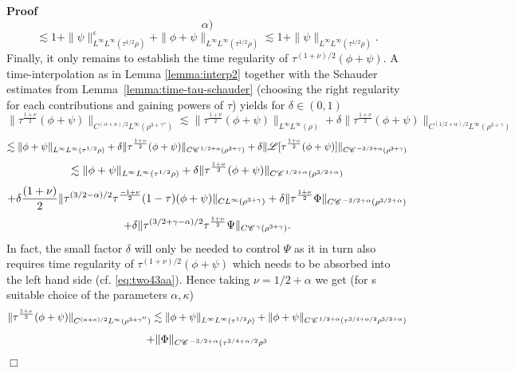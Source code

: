 \documentclass[a4paper,11pt]{article}
\newenvironment{proof}{\noindent\textbf{Proof\ }}{\hspace*{\fill}$\Box$\medskip}
\numberwithin{equation}{section}
\newcommand{\CC}{\mathscr{C} \hspace{.1em}}
\newcommand{\LL}{\mathscr{L}}
\newcommand{\8}{\infty}
\begin{document}
\begin{proof}
\[{{     \alpha})} \]
  \[ \lesssim 1 + \| \psi \|_{L^{\infty} L^{\infty} (\tau^{1 / 2}
     \rho)}^{\varepsilon} + \| \phi + \psi \|_{L^{\infty} L^{\infty} (\tau^{1
     / 2} \rho)} \lesssim 1 + \| \psi \|_{L^{\infty} L^{\infty}
     (\tau^{1 / 2} \rho)}^{} . \]
  Finally, it only remains to establish the time regularity of $\tau^{(1 +
  \nu) / 2} (\phi + \psi)$. A time-interpolation as in Lemma \ref{lemma:interp2} together with the Schauder estimates from
  Lemma~\ref{lemma:time-tau-schauder} (choosing the right regularity for each contributions and gaining
  powers of $\tau$)  yields for  $\delta\in(0,1)$
  \[ \| \tau^{\frac{1 + \nu}{2}} (\phi + \psi) \|_{C^{(\alpha + \kappa) / 2}
     L^{\infty} (\rho^{3 + \gamma''})}\lesssim  \| \tau^{\frac{1 + \nu}{2}} (\phi + \psi) \|_{L^{\8}     L^{\infty} (\rho)}+\delta \| \tau^{\frac{1 + \nu}{2}} (\phi + \psi) \|_{C^{(1/2+\alpha) / 2}
     L^{\infty} (\rho^{3 + \gamma})} \]
  \[ \lesssim  \| \phi + \psi \|_{L^{\infty} L^{\infty} (\tau^{1
     / 2} \rho)} +\delta \| \tau^{\frac{1 + \nu}{2}} (\phi + \psi) \|_{C \CC^{1/2+\alpha} (\rho^{3 + \gamma})} + \delta\| \LL [\tau^{\frac{1 + \nu}{2}} (\phi +
     \psi)]\|_{C \CC^{- 3/2 + \alpha} (\rho^{3 + \gamma})} \]
  \[ \lesssim \| \phi + \psi \|_{L^{\infty} L^{\infty} (\tau^{1
     / 2} \rho)} +\delta \| \tau^{\frac{1 + \nu}{2}} (\phi + \psi) \|_{C \CC^{1/2+\alpha} (\rho^{3/2 + \alpha})} \]
  \[ +\delta \frac{(1 + \nu)}{2} \| \tau^{(3/2 - \alpha
     ) / 2} \tau^{\frac{- 1 + \nu}{2}} (1 - \tau) (\phi + \psi) \|_{C
     L^{\infty} (\rho^{3 + \gamma})}+ \delta\|\tau^{\frac{1 + \nu}{2}} \Phi \|_{C \CC^{-
     3 / 2 + \alpha} (\rho^{3/2 + \alpha})} \]
     \begin{equation}\label{eq:tregpsi}
     + \delta\| \tau^{(3/2 + \gamma 
     - \alpha) / 2} \tau^{\frac{1 + \nu}{2}} \Psi \|_{C \CC^{\gamma}
     (\rho^{3 + \gamma})} . 
\end{equation}
 In fact, the small factor $\delta$ will only be needed to control $\Psi$ as it in turn also requires time regularity of $\tau^{(1+\nu)/2}(\phi+\psi)$ which needs to be absorbed into the left hand side (cf. \eqref{eq:two43aa}). Hence taking $\nu = 1 / 2 + \alpha$ we get (for s suitable choice of the
  parameters $\alpha, \kappa$)
\[
 \| \tau^{\frac{1 + \nu}{2}} (\phi + \psi) \|_{C^{(\alpha + \kappa) / 2}
     L^{\infty} (\rho^{3 + \gamma''})} \lesssim \|
     \phi + \psi \|_{L^{\infty} L^{\infty} (\tau^{1 / 2} \rho)}+ \| \phi + \psi \|_{C^{} \CC^{1
     / 2 + \alpha} (\tau^{3 / 4 + \alpha / 2} \rho^{3 / 2 + \alpha})}  \]
  \[ + \| \Phi \|_{C \CC^{- 3 / 2 + \alpha} (\tau^{3 / 4 + \alpha / 2} \rho^{3
}}\]
\end{proof}
\end{document}
